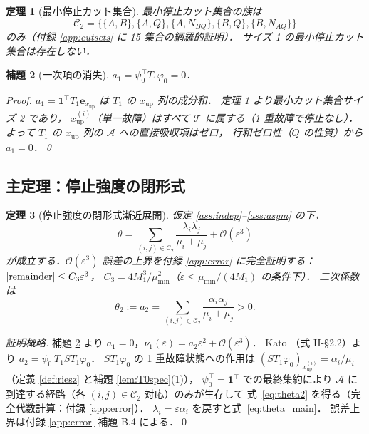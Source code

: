\documentclass[12pt,a4paper]{article}
\theoremstyle{plain}
\newtheorem{theorem}{定理}[section]
\newtheorem{lemma}[theorem]{補題}
\theoremstyle{definition}
\theoremstyle{remark}
\newcommand{\calO}{\mathcal{O}}
\newcommand{\calA}{\mathcal{A}}
\newcommand{\calT}{\mathcal{T}}
\newcommand{\eps}{\varepsilon}
\newcommand{\RedRes}{S}
\newcommand{\calCtwo}{\mathcal{C}_2}
\begin{document}
\begin{theorem}[最小停止カット集合]\label{thm:mincut}
  最小停止カット集合の族は
  \begin{equation}\label{eq:mincuts}
    \calCtwo = \bigl\{
      \{A,B\},\{A,Q\},\{A,N_{BQ}\},\{B,Q\},\{B,N_{AQ}\}
    \bigr\}
  \end{equation}
  のみ（付録 \ref{app:cutsets} に 15 集合の網羅的証明）．
  サイズ 1 の最小停止カット集合は存在しない．
\end{theorem}

\begin{lemma}[一次項の消失]\label{lem:a1zero}
  $a_1 = \psi_0^\top T_1\varphi_0 = 0$．

  \begin{proof}
    $a_1 = \mathbf{1}^\top T_1\mathbf{e}_{x_{\mathrm{up}}}$
    は $T_1$ の $x_{\mathrm{up}}$ 列の成分和．
    定理 \ref{thm:mincut} より最小カット集合サイズ 2 であり，
    $x_{\mathrm{up}}^{(i)}$（単一故障）はすべて $\calT$ に属する（1 重故障で停止なし）．
    よって $T_1$ の $x_{\mathrm{up}}$ 列の $\calA$ への直接吸収項はゼロ，
    行和ゼロ性（$Q$ の性質）から $a_1=0$．\qed
  \end{proof}
\end{lemma}

\subsection{主定理：停止強度の閉形式}

\begin{theorem}[停止強度の閉形式漸近展開]\label{thm:theta_main}
  仮定 \ref{ass:indep}--\ref{ass:asym} の下，
  \begin{equation}\label{eq:theta_main}
    \boxed{
    \theta = \sum_{(i,j)\in\calCtwo}\frac{\lambda_i\lambda_j}{\mu_i+\mu_j}
    + \calO(\eps^3)
    }
  \end{equation}
  が成立する．$\calO(\eps^3)$ 誤差の上界を付録 \ref{app:error} に完全証明する：
  $|{\rm remainder}|\le C_3\eps^3$，
  $C_3 = 4M_1^3/\mu_{\min}^2$（$\eps\le\mu_{\min}/(4M_1)$ の条件下）．
  二次係数は
  \begin{equation}\label{eq:theta2}
    \theta_2 := a_2 = \sum_{(i,j)\in\calCtwo}\frac{\alpha_i\alpha_j}{\mu_i+\mu_j} > 0.
  \end{equation}
\end{theorem}

\begin{proof}[証明概略]
  補題 \ref{lem:a1zero} より $a_1=0$，$\nu_1(\eps)=a_2\eps^2+\calO(\eps^3)$．
  Kato \cite{kato1995}（式 II-\S2.2）より $a_2=\psi_0^\top T_1\RedRes T_1\varphi_0$．
  $\RedRes T_1\varphi_0$ の 1 重故障状態への作用は
  $(\RedRes T_1\varphi_0)_{x_{\mathrm{up}}^{(i)}}=\alpha_i/\mu_i$
  （定義 \ref{def:riesz} と補題 \ref{lem:T0spec}(1)），
  $\psi_0^\top=\mathbf{1}^\top$ での最終集約により
  $\calA$ に到達する経路（各 $(i,j)\in\calCtwo$ 対応）のみが生存して
  式~\eqref{eq:theta2} を得る（完全代数計算：付録 \ref{app:error}）．
  $\lambda_i=\eps\alpha_i$ を戻すと式~\eqref{eq:theta_main}．
  誤差上界は付録 \ref{app:error} 補題 B.4 による．\qed
\end{proof}
\end{document}
